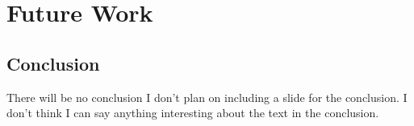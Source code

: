 \section{Future Work}
\subsection{Conclusion}
\begin{frame}{There will be no conclusion}
I don't plan on including a slide for the conclusion.
I don't think I can say anything interesting about the text in the conclusion.
\end{frame}